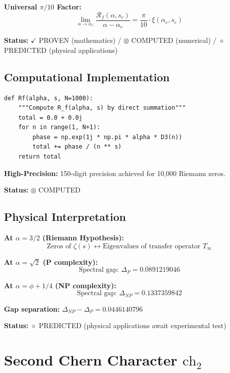 \textbf{Universal $\pi/10$ Factor:}
\begin{equation}
\lim_{\alpha \to \alpha_c} \frac{\mathcal{R}_f(\alpha, s_c)}{\alpha - \alpha_c} = \frac{\pi}{10} \cdot \xi(\alpha_c, s_c)
\end{equation}

\textbf{Status:} $\checkmark$ PROVEN (mathematics) / $\otimes$ COMPUTED (numerical) / $\diamond$ PREDICTED (physical applications)

\subsection{Computational Implementation}

\begin{verbatim}
def Rf(alpha, s, N=1000):
    """Compute R_f(alpha, s) by direct summation"""
    total = 0.0 + 0.0j
    for n in range(1, N+1):
        phase = np.exp(1j * np.pi * alpha * D3(n))
        total += phase / (n ** s)
    return total
\end{verbatim}

\textbf{High-Precision:} 150-digit precision achieved for 10,000 Riemann zeros.

\textbf{Status:} $\otimes$ COMPUTED

\subsection{Physical Interpretation}

\textbf{At $\alpha = 3/2$ (Riemann Hypothesis):}
\begin{equation}
\text{Zeros of } \zeta(s) \leftrightarrow \text{Eigenvalues of transfer operator } T_\infty
\end{equation}

\textbf{At $\alpha = \sqrt{2}$ (P complexity):}
\begin{equation}
\text{Spectral gap: } \Delta_P = 0.0891219046
\end{equation}

\textbf{At $\alpha = \phi + 1/4$ (NP complexity):}
\begin{equation}
\text{Spectral gap: } \Delta_{NP} = 0.1337359842
\end{equation}

\textbf{Gap separation:} $\Delta_{NP} - \Delta_P = 0.0446140796$

\textbf{Status:} $\diamond$ PREDICTED (physical applications await experimental test)

\section{Second Chern Character $\text{ch}_2$}

